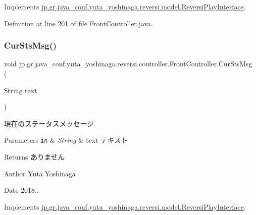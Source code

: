 Implements \mbox{\hyperlink{interfacejp_1_1gr_1_1java__conf_1_1yuta__yoshinaga_1_1reversi_1_1model_1_1_reversi_play_interface}{jp.\+gr.\+java\+\_\+conf.\+yuta\+\_\+yoshinaga.\+reversi.\+model.\+Reversi\+Play\+Interface}}.



Definition at line 201 of file Front\+Controller.\+java.

\mbox{\label{classjp_1_1gr_1_1java__conf_1_1yuta__yoshinaga_1_1reversi_1_1controller_1_1_front_controller_a49315230e704778721afb73c59e14d88}} 
\subsubsection{\texorpdfstring{Cur\+Sts\+Msg()}{CurStsMsg()}}
{\footnotesize\ttfamily void jp.\+gr.\+java\+\_\+conf.\+yuta\+\_\+yoshinaga.\+reversi.\+controller.\+Front\+Controller.\+Cur\+Sts\+Msg (\begin{DoxyParamCaption}\item[{String}]{text }\end{DoxyParamCaption})}



現在のステータスメッセージ 


\begin{DoxyParams}[1]{Parameters}
\mbox{\tt in}  & {\em String} & text テキスト \\
\hline
\end{DoxyParams}
\begin{DoxyReturn}{Returns}
ありません 
\end{DoxyReturn}
\begin{DoxyAuthor}{Author}
Yuta Yoshinaga 
\end{DoxyAuthor}
\begin{DoxyDate}{Date}
2018.. 
\end{DoxyDate}


Implements \mbox{\hyperlink{interfacejp_1_1gr_1_1java__conf_1_1yuta__yoshinaga_1_1reversi_1_1model_1_1_reversi_play_interface}{jp.\+gr.\+java\+\_\+conf.\+yuta\+\_\+yoshinaga.\+reversi.\+model.\+Reversi\+Play\+Interface}}.




